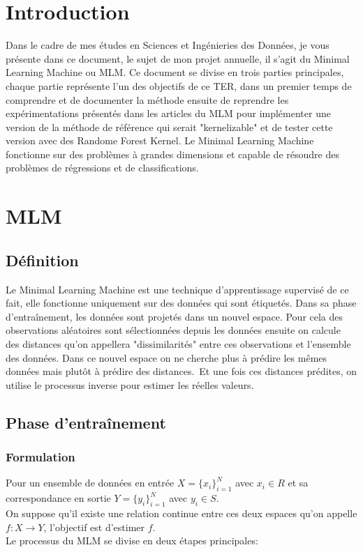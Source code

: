 \documentclass[12pt,a4paper]{report}
\begin{document}
\chapter{Introduction}
\par Dans le cadre de mes études en Sciences et Ingénieries des Données, je vous présente dans ce document, le sujet de mon projet annuelle, il s'agit du Minimal Learning Machine ou MLM. Ce document se divise en trois parties principales, chaque partie représente l'un des objectifs de ce TER, dans un premier temps de comprendre et de documenter la méthode ensuite de reprendre les expérimentations présentés dans les articles du MLM pour implémenter une version de la méthode de référence qui serait "kernelizable" et de tester cette version avec des Randome Forest Kernel. Le Minimal Learning Machine fonctionne sur des problèmes à grandes dimensions et capable de résoudre des problèmes de régressions et de classifications.

\chapter{MLM}
\section{Définition}
\par Le Minimal Learning Machine est une technique d'apprentissage supervisé de ce fait, elle fonctionne uniquement sur des données qui sont étiquetés. Dans sa phase d'entraînement, les données sont projetés dans un nouvel espace.
Pour cela des observations aléatoires sont sélectionnées depuis les données ensuite on calcule des distances qu'on appellera "dissimilarités" entre ces observations et l'ensemble des données. Dans ce nouvel espace on ne cherche plus à prédire les mêmes données mais plutôt à prédire des distances.\ 
Et une fois ces distances prédites, on utilise le processus inverse pour estimer les réelles valeurs.\
 
\section{Phase d'entraînement }
\subsection{Formulation}
\par Pour un ensemble de données en entrée $X = \{x_i\}_{i=1}^{N}$ avec
$x_i \in R$ et sa correspondance en sortie $Y = \{y_i\}_{i=1}^{N}$ avec $y_i \in S$.\\
On suppose qu'il existe une relation continue entre ces deux espaces qu'on appelle $f: X \rightarrow Y$, l'objectif est d'estimer $f$.\\
Le processus du MLM se divise en deux étapes principales:
\end{document}
